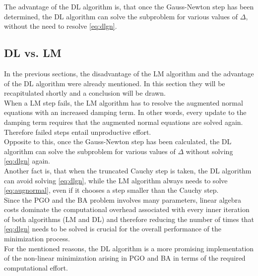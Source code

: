 The advantage of the \ac{DL} algorithm is, that once the Gauss-Newton step has been determined, the \ac{DL} algorithm can solve the subproblem for various values of $\Delta$, without the need to resolve \autoref{eq:dlgn}.

\subsection{\acf{DL} vs. \acf{LM}}
In the previous sections, the disadvantage of the \ac{LM} algorithm and the advantage of the \ac{DL} algorithm were already mentioned. In this section they will be recapitulated shortly and a conclusion will be drawn.\\

When a \ac{LM} step fails, the \ac{LM} algorithm has to resolve the augmented normal equations with an increased damping term. In other words, every update to the damping term requires that the augmented normal equations are solved again. Therefore failed steps entail unproductive effort.\\
Opposite to this, once the Gauss-Newton step has been calculated, the \ac{DL} algorithm can solve the subproblem for various values of $\Delta$ without solving \autoref{eq:dlgn} again.\\
Another fact is, that when the truncated Cauchy step is taken, the \ac{DL} algorithm can avoid solving \autoref{eq:dlgn}, while the \ac{LM} algorithm always needs to solve \autoref{eq:augnormal}, even if it chooses a step smaller than the Cauchy step.\\

Since the \ac{PGO} and the \ac{BA} problem involves many parameters, linear algebra costs dominate the computational overhead associated with every inner iteration of both algorithms (\ac{LM} and \ac{DL}) and therefore reducing the number of times that \autoref{eq:dlgn} needs to be solved is crucial for the overall performance of the minimization process.\\
For the mentioned reasons, the \ac{DL} algorithm is a more promising implementation of the non-linear minimization arising in \ac{PGO} and \ac{BA} in terms of the required computational effort.
